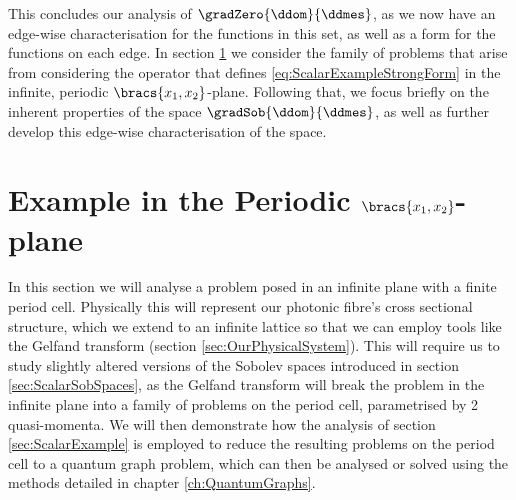 This concludes our analysis of $\gradZero{\ddom}{\ddmes}$, as we now have an edge-wise characterisation for the functions in this set, as well as a form for the functions on each edge.
In section \ref{sec:ScalarSystem} we consider the family of problems that arise from considering the operator that defines \eqref{eq:ScalarExampleStrongForm} in the infinite, periodic $\bracs{x_1,x_2}$-plane.
Following that, we focus briefly on the inherent properties of the space $\gradSob{\ddom}{\ddmes}$, as well as further develop this edge-wise characterisation of the space.

\section{Example in the Periodic $\bracs{x_1,x_2}$-plane} \label{sec:ScalarSystem}
In this section we will analyse a problem posed in an infinite plane with a finite period cell.
Physically this will represent our photonic fibre's cross sectional structure, which we extend to an infinite lattice so that we can employ tools like the Gelfand transform (section \ref{sec:OurPhysicalSystem}).
This will require us to study slightly altered versions of the Sobolev spaces introduced in section \ref{sec:ScalarSobSpaces}, as the Gelfand transform will break the problem in the infinite plane into a family of problems on the period cell, parametrised by 2 quasi-momenta.
We will then demonstrate how the analysis of section \ref{sec:ScalarExample} is employed to reduce the resulting problems on the period cell to a quantum graph problem, which can then be analysed or solved using the methods detailed in chapter \ref{ch:QuantumGraphs}. \newline

